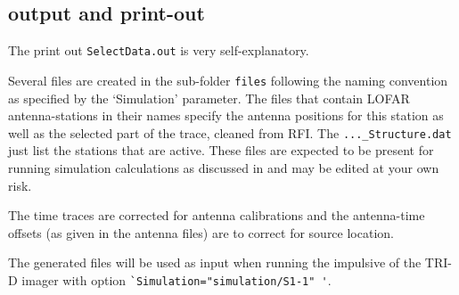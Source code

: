 \subsection{output and print-out}

The print out \verb!SelectData.out! is very self-explanatory.

Several files are created in the sub-folder \verb!files! following the naming convention as specified by the `Simulation' parameter. The files that contain LOFAR antenna-stations in their names specify the antenna positions for this station as well as the selected part of the trace, cleaned from RFI. The \verb!..._Structure.dat! just list the stations that are active. These files are expected to be present for running simulation calculations as discussed in  and may be edited at your own risk.

The time traces are corrected for antenna calibrations and the antenna-time offsets (as given in the antenna files) are to correct for source location.

The generated files will be used as input when running the impulsive of the TRI-D imager with option \verb!`Simulation="simulation/S1-1" '!.